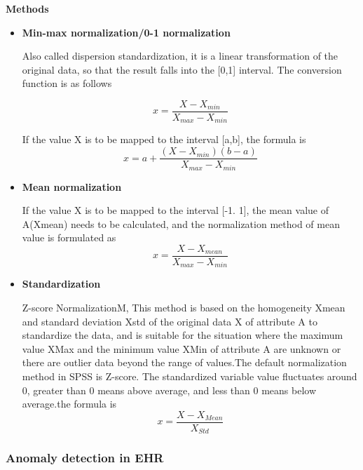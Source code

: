\textbf{Methods}
\begin{itemize}
\item \textbf{Min-max normalization/0-1 normalization}

Also called dispersion standardization, it is a linear transformation of the original data, so that the result falls into the [0,1] interval. The conversion function is as follows


\begin{equation}
x=\frac{X-X_{min}}{X_{max}-X_{min} }
\end{equation}



If the value X is to be mapped to the interval [a,b], the formula is\\
\[
x=a+\frac{(X-X_{min})(b-a)}{X_{max}-X_{min}}
\]


\item \textbf{Mean normalization }

If the value X is to be mapped to the interval [-1. 1], the mean value of A(Xmean) needs to be calculated, and the normalization method of mean value is formulated as\\

\begin{equation}
x=\frac{X-X_{mean}}{X_{max}-X_{min} }
\end{equation}


\item \textbf{Standardization }

Z-score NormalizationM, This method is based on the homogeneity Xmean and standard deviation Xstd of the original data X of attribute A to standardize the data, and is suitable for the situation where the maximum value XMax and the minimum value XMin of attribute A are unknown or there are outlier data beyond the range of values.The default normalization method in SPSS is Z-score. The standardized variable value fluctuates around 0, greater than 0 means above average, and less than 0 means below average.the formula is\\

\begin{equation}
x=\frac{X-X_{Mean}}{X_{Std}}
\end{equation}
\end{itemize}


\subsubsection{Anomaly detection in EHR}%

